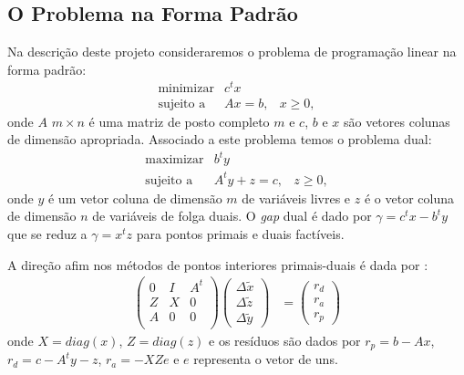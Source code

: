 \documentclass[12pt]{article}
\begin{document}
\subsection{O Problema na Forma Padrão}
Na descrição deste projeto consideraremos o problema de programação linear na
forma padrão:
\begin{displaymath}
\begin{array}{lll}
\text{minimizar} & c^tx & \\
\text{sujeito a} & Ax = b, & x \ge 0,
\end{array}
\end{displaymath}
onde $A$ $m \times n$  é uma matriz de posto completo $m$
e $c$, $b$ e $x$ são vetores colunas de dimensão apropriada.
Associado a este problema temos o problema dual:
\begin{displaymath}
\begin{array}{lll}
\text{maximizar} & b^ty &\\
\text{sujeito a} & A^ty + z = c, & z \ge 0,
\end{array}
\end{displaymath}
onde $y$ é um vetor coluna de dimensão $m$ de variáveis livres e $z$ é o vetor
coluna de dimensão $n$ de variáveis de folga duais. O {\it gap} dual é
dado por $\gamma= c^tx - b^ty$ que se reduz a $\gamma= x^tz$ para
pontos primais e duais factíveis.

A direção afim nos métodos de pontos interiores primais-duais é dada por
\cite{MAR90,Wr96}:
\begin{eqnarray} \label{BS}
\left(\begin{array}{llc}
0 & I & A^{t}\\
Z & X & 0\\
A & 0 & 0\\
\end{array} \right)
\left(\begin{array}{r}
\Delta \tilde{x}\\
\Delta \tilde{z}\\
\Delta \tilde{y}
\end{array} \right) &=
\left(\begin{array}{c}
r_d\\
r_a\\
r_p
\end{array} \right)
\end{eqnarray}
onde $X = diag(x)$, $Z = diag(z)$ e os resíduos são dados por $r_p = b - Ax$,
$r_d = c - A^ty - z$, $r_a = -XZe$ e $e$ representa o vetor de uns.
\end{document}
